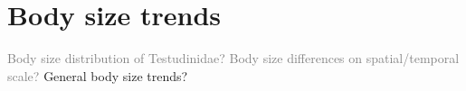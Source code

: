 \section{Body size trends}

\begin{frame}
\begin{enumerate}
	
	\p \textcolor{gray}{Body size distribution of Testudinidae?
		\bigskip
		\p Body size differences on spatial/temporal scale? }
	\bigskip
	\p General body size trends?
\end{enumerate}
\end{frame}